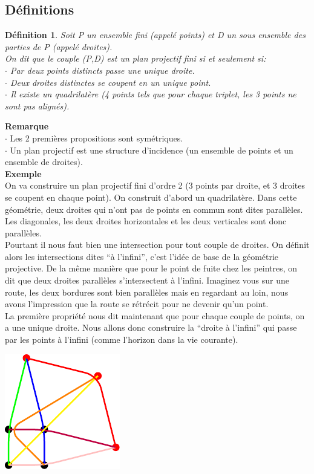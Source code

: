 \documentclass[a4paper]{article}
\newtheorem{Def}{Définition}[section]
\begin{document}
\subsection{Définitions}
\begin{Def}
Soit P un ensemble fini (appelé points) et D un sous ensemble des parties de P (appelé droites). \\
On dit que le couple (P,D) est un plan projectif fini si et seulement si: \\
$\cdot$ Par deux points distincts passe une unique droite. \\
$\cdot$ Deux droites distinctes se coupent en un unique point. \\
$\cdot$ Il existe un quadrilatère (4 points tels que pour chaque triplet, les 3 points ne sont pas alignés).
\end{Def}
\textbf{Remarque}\\
  $\cdot$ Les 2 premières propositions sont symétriques. \\
$\cdot$ Un plan projectif est une structure d'incidence (un ensemble de points et un ensemble de droites).\vspace{1\baselineskip}\\
\textbf{Exemple}\\
On va construire un plan projectif fini d'ordre 2 (3 points par droite, et 3 droites se coupent en chaque point). On construit d'abord un quadrilatère. Dans cette géométrie, deux droites qui n'ont pas de points en commun sont dites parallèles. Les diagonales, les deux droites horizontales et les deux verticales \vspace{1\baselineskip}sont donc parallèles.\\
  Pourtant il nous faut bien une intersection pour tout couple de droites. On définit alors les intersections dites ``à l'infini'', c'est l'idée de base de la géométrie projective. De la même manière que pour le point de fuite chez les peintres, on dit que deux droites parallèles s'intersectent à l'infini. Imaginez vous sur une route, les deux bordures sont bien parallèles mais en regardant au loin, nous avons l'impression que la route se rétrécit pour ne devenir\vspace{1\baselineskip} qu'un point.\\
La première propriété nous dit maintenant que pour chaque couple de points, on a une unique droite. Nous allons donc construire la ``droite à l'infini'' qui passe par les points à l'infini (comme l'horizon dans la vie courante).
\begin{center}
\includegraphics[scale=0.5]{test_tikz.pdf}
\end{center}
\end{document}
